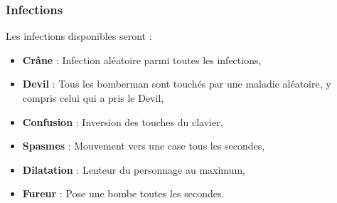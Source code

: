 \subsubsection{Infections}

Les infections disponibles seront :
\begin{itemize}
\item \textbf{Crâne} : Infection aléatoire parmi toutes les infections,
\item \textbf{Devil} : Tous les bomberman sont touchés par une maladie aléatoire, y compris celui qui a pris le Devil,
\item \textbf{Confusion} : Inversion des touches du clavier,
\item \textbf{Spasmes} : Mouvement vers une case tous les \nbSecondes secondes,
\item \textbf{Dilatation} : Lenteur du personnage au maximum,
\item \textbf{Fureur} : Pose une bombe toutes les \nbSecondes secondes.
\end{itemize}